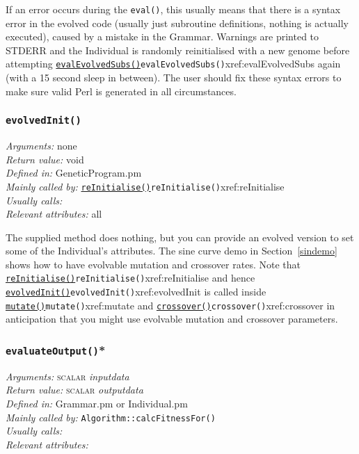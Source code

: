 \documentclass[a4paper]{article}
\begin{document}
If an error occurs during the \texttt{eval()}, this usually means that
there is a syntax error in the evolved code (usually just subroutine
definitions, nothing is actually executed), caused by a mistake in the
Grammar.  Warnings are printed to STDERR and the Individual is
randomly reinitialised with a new genome before attempting
\hyperref[no]{\texttt{evalEvolvedSubs()}}{\texttt{evalEvolvedSubs()}}{xref:evalEvolvedSubs} again (with a 15 second sleep in between).
The user should fix these syntax errors to make sure valid Perl is
generated in all circumstances.

\subsubsection{\texttt{evolvedInit()}}\label{xref:evolvedInit}
\begin{flushleft}
\textit{Arguments:} none\\
\textit{Return value:} void\\
\textit{Defined in:} GeneticProgram.pm\\
\textit{Mainly called by:} \hyperref[no]{\texttt{reInitialise()}}{\texttt{reInitialise()}}{xref:reInitialise}\\
\textit{Usually calls:} \\
\textit{Relevant attributes:} all
\end{flushleft}

The supplied method does nothing, but you can provide an evolved
version to set some of the Individual's attributes.  The sine curve
demo in Section~\ref{sindemo} shows how to have evolvable mutation and
crossover rates.  Note that \hyperref[no]{\texttt{reInitialise()}}{\texttt{reInitialise()}}{xref:reInitialise} and hence
\hyperref[no]{\texttt{evolvedInit()}}{\texttt{evolvedInit()}}{xref:evolvedInit} is called inside \hyperref[no]{\texttt{mutate()}}{\texttt{mutate()}}{xref:mutate} and
\hyperref[no]{\texttt{crossover()}}{\texttt{crossover()}}{xref:crossover} in anticipation that you might use evolvable
mutation and crossover parameters.

\subsubsection{\texttt{evaluateOutput()}*}\label{xref:evaluateOutput}
\begin{flushleft}
\textit{Arguments:} \textsc{scalar} \textit{inputdata}\\
\textit{Return value:} \textsc{scalar} \textit{outputdata}\\
\textit{Defined in:} Grammar.pm or Individual.pm\\
\textit{Mainly called by:} \texttt{Algorithm::calcFitnessFor()}\\
\textit{Usually calls:} \\
\textit{Relevant attributes:}
\end{flushleft}
\end{document}
